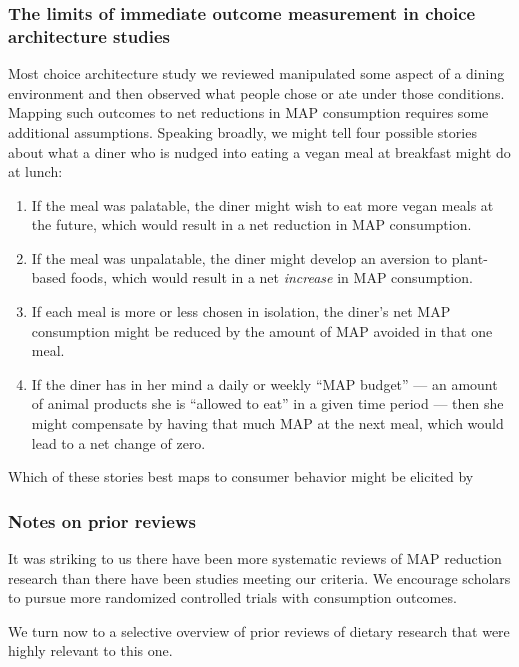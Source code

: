 \documentclass[sn-nature,referee,pdflatex]{sn-jnl}
\providecommand{\tightlist}{%
  \setlength{\itemsep}{0pt}\setlength{\parskip}{0pt}}
\begin{document}
\subsubsection{The limits of immediate outcome measurement in choice
architecture
studies}\label{the-limits-of-immediate-outcome-measurement-in-choice-architecture-studies}

Most choice architecture study we reviewed manipulated some aspect of a
dining environment and then observed what people chose or ate under
those conditions. Mapping such outcomes to net reductions in MAP
consumption requires some additional assumptions. Speaking broadly, we
might tell four possible stories about what a diner who is nudged into
eating a vegan meal at breakfast might do at lunch:

\begin{enumerate}
\def\labelenumi{\arabic{enumi}.}
\tightlist
\item
  If the meal was palatable, the diner might wish to eat more vegan
  meals at the future, which would result in a net reduction in MAP
  consumption.
\item
  If the meal was unpalatable, the diner might develop an aversion to
  plant-based foods, which would result in a net \emph{increase} in MAP
  consumption.
\item
  If each meal is more or less chosen in isolation, the diner's net MAP
  consumption might be reduced by the amount of MAP avoided in that one
  meal.
\item
  If the diner has in her mind a daily or weekly ``MAP budget'' --- an
  amount of animal products she is ``allowed to eat'' in a given time
  period --- then she might compensate by having that much MAP at the
  next meal, which would lead to a net change of zero.
\end{enumerate}

Which of these stories best maps to consumer behavior might be elicited
by

\subsubsection{Notes on prior reviews}\label{sec5.4.5}

It was striking to us there have been more systematic reviews of MAP
reduction research than there have been studies meeting our criteria. We
encourage scholars to pursue more randomized controlled trials with
consumption outcomes.

We turn now to a selective overview of prior reviews of dietary research
that were highly relevant to this one.
\end{document}
